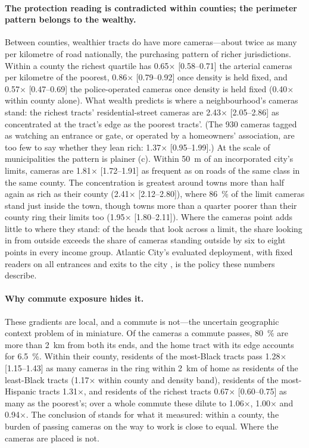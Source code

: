 \documentclass[11pt,twoside]{article}
\begin{document}
\paragraph{The protection reading is contradicted within counties; the perimeter pattern belongs
to the wealthy.} Between counties, wealthier tracts do have more cameras---about twice as many
per kilometre of road nationally, the purchasing pattern of richer jurisdictions. Within a
county the richest quartile has \num{0.65}$\times$ [0.58--0.71] the arterial cameras per
kilometre of the poorest, \num{0.86}$\times$ [0.79--0.92] once density is held fixed, and
\num{0.57}$\times$ [0.47--0.69] the police-operated cameras once density is held fixed
(\num{0.40}$\times$ within county alone). What wealth predicts is where a
neighbourhood's cameras stand: the richest tracts' residential-street cameras are
\num{2.43}$\times$ [2.05--2.86] as concentrated at the tract's edge as the poorest tracts'. (The
930 cameras tagged as watching an entrance or gate, or operated by a homeowners' association, are
too few to say whether they lean rich: \num{1.37}$\times$ [0.95--1.99].) At the scale of municipalities
the pattern is plainer (c). Within \SI{50}{\metre} of an incorporated
city's limits, cameras are \num{1.81}$\times$ [1.72--1.91] as frequent as on roads of the same class
in the same county. The concentration is greatest around towns more than half again as rich as
their county (\num{2.41}$\times$ [2.12--2.80]), where \SI{86}{\percent} of the limit cameras stand
just inside the town, though towns more than a quarter poorer than their county ring their
limits too (\num{1.95}$\times$ [1.80--2.11]). Where the cameras point adds little to where they stand: of the
heads that look across a limit, the share looking in from outside exceeds the share of cameras
standing outside by six to eight points in every income group. Atlantic City's evaluated deployment, with fixed readers on all
entrances and exits to the city \citep{shjarback2025}, is the policy these numbers
describe.

\paragraph{Why commute exposure hides it.} These gradients are local, and a commute is not---the
uncertain geographic context problem of \citet{kwan2012} in miniature. Of the
cameras a commute passes, \SI{80}{\percent} are more than \SI{2}{\kilo\metre} from both its ends,
and the home tract with its edge accounts for \SI{6.5}{\percent}. Within their county, residents
of the most-Black tracts pass \num{1.28}$\times$ [1.15--1.43] as many cameras in the ring within
\SI{2}{\kilo\metre} of home as residents of the least-Black tracts (\num{1.17}$\times$ within
county and density band), residents of the most-Hispanic tracts \num{1.31}$\times$, and residents
of the richest tracts \num{0.67}$\times$ [0.60--0.75] as many as the poorest's; over a whole
commute these dilute to \num{1.06}$\times$, \num{1.00}$\times$ and \num{0.94}$\times$. The
conclusion of  stands for what it measured: within a county, the
burden of passing cameras on the way to work is close to equal. Where the cameras are placed is
not.
\end{document}
